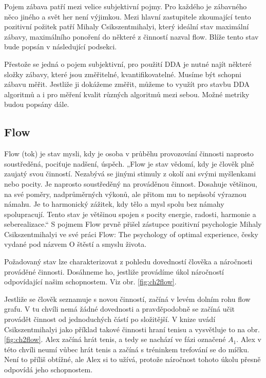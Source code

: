 Pojem zábava patří mezi velice subjektivní pojmy. Pro každého je zábavného něco jiného a svět her není výjimkou. Mezi hlavní zastupitele zkoumající tento pozitivní požitek patří Mihaly Csikszentmihalyi, který ideální stav maximální zábavy, maximálního ponoření do některé z činností nazval flow. Blíže tento stav bude popsán v následující podsekci.

Přestože se jedná o pojem subjektivní, pro použití DDA je nutné najít některé složky zábavy, které jsou změřitelné, kvantifikovatelné. Musíme být schopni zábavu měřit. Jestliže ji dokážeme změřit, můžeme to využít pro stavbu DDA algoritmů a i pro měření kvalit různých algoritmů mezi sebou. Možné metriky budou popsány dále.

\subsection{Flow}

Flow (tok) je stav mysli, kdy je osoba v průběhu provozování činnosti naprosto soustředěná, pociťuje nadšení, úspěch. „Flow je stav vědomí, kdy je člověk plně zaujatý svou činností. Nezabývá se jinými stimuly z okolí ani svými myšlenkami nebo pocity. Je naprosto soustředěný na prováděnou činnost. Dosahuje většinou, na své poměry, nadprůměrných výkonů, ale přitom mu to nepůsobí výraznou námahu. Je to harmonický zážitek, kdy tělo a mysl spolu bez námahy spolupracují. Tento stav je většinou spojen s pocity energie, radosti, harmonie a seberealizace.“ \cite{FlowCZ} S pojmem Flow prvně přišel zástupce pozitivní psychologie Mihaly Csikszentmihalyi ve své práci Flow: The psychology of optimal experience, česky vydané pod názvem O štěstí a smyslu života.

Požadovaný stav lze charakterizovat z pohledu dovedností člověka a náročnosti prováděné činnosti. Dosáhneme ho, jestliže provádíme úkol náročností odpovídající našim schopnostem. Viz obr. \ref{fig:ch2flow}. 

Jestliže se člověk seznamuje s novou činností, začíná v levém dolním rohu flow grafu. V tu chvíli nemá žádné dovednosti a pravděpodobně se začíná učit provádět činnost od jednoduchých částí po složitější. V knize \cite{OptimalFun} uvádí Csikszentmihalyi jako příklad takové činnosti hraní tenisu a vysvětluje to na obr. \ref{fig:ch2flow}. Alex začíná hrát tenis, a tedy se nachází ve fázi označené $A_1$. Alex v této chvíli neumí vůbec hrát tenis a začíná s tréninkem trefování se do míčku. Není to příliš obtížné, ale Alex si to užívá, protože náročnost tohoto úkolu přesně odpovídá jeho schopnostem.

